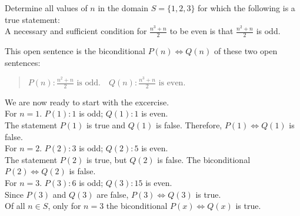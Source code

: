 \documentclass[12pt]{article}
\newenvironment{problem}[2][Problem]{\begin{trivlist}
		\item[\hskip \labelsep {\bfseries #1}\hskip \labelsep {\bfseries #2.}]}{\end{trivlist}}
\newenvironment{solution}[2][Solution]{\begin{trivlist}
		\item[\hskip \labelsep {\bfseries #1}\hskip \labelsep {\bfseries #2.}]}{\end{trivlist}}
\begin{document}
\begin{problem}{41}
	Determine all values of $n$ in the domain $S = \{1,2,3\}$ for which the following is a true statement:\\
	A necessary and sufficient condition for $\frac{n^{3} + n}{2}$ to be even is that $\frac{n^{2}+n}{2}$ is odd.
	
	\begin{solution}{}
	This open sentence is the biconditional $P(n) \Leftrightarrow Q(n)$ of these two open sentences:
	\begin{quote}
		\centering
		$P(n) : \frac{n^{2}+n}{2} \text{ is odd.} \quad Q(n) : \frac{n^{3} + n}{2} \text{ is even.}$
	\end{quote}
	We are now ready to start with the excercise.\\
	
	For $n = 1$. $P(1): 1$ is odd; $Q(1): 1$ is even.\\
	The statement $P(1)$ is true and $Q(1)$ is false. Therefore, $P(1) \Leftrightarrow Q(1)$ is false.\\
	
	For $n = 2$. $P(2): 3$ is odd; $Q(2): 5$ is even.\\
	The statement $P(2)$ is true, but $Q(2)$ is false. The biconditional $P(2) \Leftrightarrow Q(2)$ is false.\\
	
	For $n = 3$. $P(3): 6$ is odd; $Q(3): 15$ is even.\\
	Since $P(3)$ and $Q(3)$ are false, $P(3) \Leftrightarrow Q(3)$ is true.\\
	Of all $n \in S$, only for $n = 3$ the biconditional $P(x) \Leftrightarrow Q(x)$ is true.
	\end{solution}
\end{problem}
\end{document}
